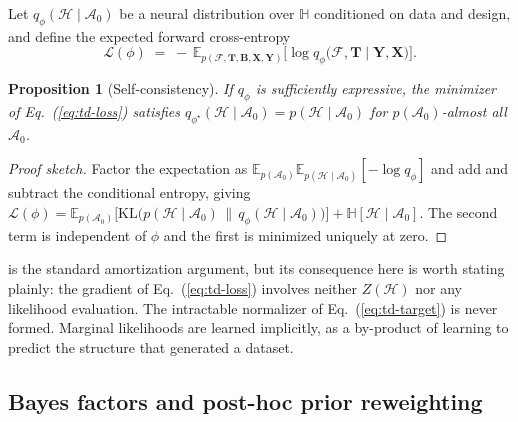 \documentclass[11pt]{article}
\newcommand{\rmB}{\mathbf{B}}
\newcommand{\rmX}{\mathbf{X}}
\newcommand{\rmY}{\mathbf{Y}}
\newcommand{\rmT}{\mathbf{T}}
\providecommand{\cref}[1]{Eq.~(\ref{#1})}
\newtheorem{proposition}{Proposition}
\begin{document}
Let $q_\phi(\mathcal{H} \mid \mathcal{A}_0)$ be a neural distribution over
$\mathbb{H}$ conditioned on data and design, and define the expected forward
cross-entropy
%
\begin{equation}
\label{eq:td-loss}
\mathcal{L}(\phi) \;=\; -\,\mathbb{E}_{p(\mathcal{F},\rmT,\rmB,\rmX,\rmY)}
\Big[ \log q_\phi\big(\mathcal{F}, \rmT \mid \rmY, \rmX\big) \Big].
\end{equation}

\begin{proposition}[Self-consistency]
\label{prop:td-selfconsistency}
If $q_\phi$ is sufficiently expressive, the minimizer of \cref{eq:td-loss} satisfies
$q_{\phi^\star}(\mathcal{H} \mid \mathcal{A}_0) = p(\mathcal{H} \mid \mathcal{A}_0)$
for $p(\mathcal{A}_0)$-almost all $\mathcal{A}_0$.
\end{proposition}

\begin{proof}[Proof sketch]
Factor the expectation as
$\mathbb{E}_{p(\mathcal{A}_0)}\mathbb{E}_{p(\mathcal{H}\mid\mathcal{A}_0)}[-\log q_\phi]$
and add and subtract the conditional entropy, giving
$\mathcal{L}(\phi) = \mathbb{E}_{p(\mathcal{A}_0)}\big[\mathrm{KL}\big(p(\mathcal{H}\mid\mathcal{A}_0)\,\|\,q_\phi(\mathcal{H}\mid\mathcal{A}_0)\big)\big] + \mathbb{H}[\mathcal{H}\mid\mathcal{A}_0]$.
The second term is independent of $\phi$ and the first is minimized uniquely at zero.
\end{proof}

 is the standard amortization argument, but its
consequence here is worth stating plainly: the gradient of \cref{eq:td-loss} involves
neither $Z(\mathcal{H})$ nor any likelihood evaluation. The intractable normalizer of
\cref{eq:td-target} is never formed. Marginal likelihoods are learned implicitly, as a
by-product of learning to predict the structure that generated a dataset.

\subsection{Bayes factors and post-hoc prior reweighting}
\end{document}
